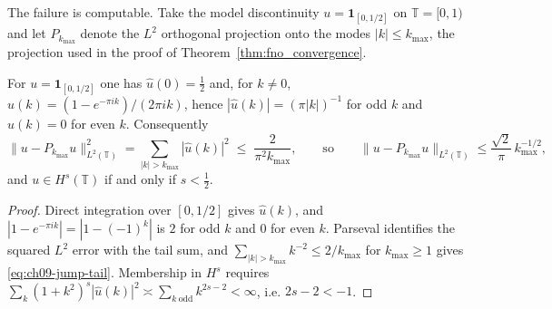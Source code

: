 The failure is computable. Take the model discontinuity
$u = \mathbf{1}_{[0,1/2]}$ on $\mathbb{T}=[0,1)$ and let $P_{k_{\max}}$ denote
the $L^2$ orthogonal projection onto the modes $|k|\le k_{\max}$, the projection
used in the proof of Theorem~\ref{thm:fno_convergence}.

\begin{proposition}
\label{prop:ch09-jump}
For $u=\mathbf{1}_{[0,1/2]}$ one has $\hat{u}(0)=\tfrac12$ and, for $k\ne 0$,
$\hat{u}(k) = (1-e^{-\pi i k})/(2\pi i k)$,
hence $|\hat{u}(k)| = (\pi|k|)^{-1}$ for odd $k$ and $\hat{u}(k)=0$ for even
$k$. Consequently
\begin{equation}
  \|u - P_{k_{\max}} u\|_{L^2(\mathbb{T})}^{2}
  = \sum_{|k|>k_{\max}}|\hat{u}(k)|^{2}
  \;\le\; \frac{2}{\pi^{2}k_{\max}},
  \qquad\text{so}\qquad
  \|u-P_{k_{\max}}u\|_{L^2(\mathbb{T})} \le \frac{\sqrt{2}}{\pi}\,k_{\max}^{-1/2},
  \label{eq:ch09-jump-tail}
\end{equation}
and $u\in H^s(\mathbb{T})$ if and only if $s<\tfrac12$.
\end{proposition}
\begin{proof}
Direct integration over $[0,1/2]$ gives $\hat{u}(k)$, and
$|1-e^{-\pi i k}| = |1-(-1)^k|$ is $2$ for odd $k$ and $0$ for even $k$. Parseval
identifies the squared $L^2$ error with the tail sum, and
$\sum_{|k|>k_{\max}}k^{-2}\le 2/k_{\max}$ for $k_{\max}\ge1$ gives
\eqref{eq:ch09-jump-tail}.
Membership in $H^s$ requires
$\sum_k (1+k^2)^s|\hat u(k)|^2 \asymp \sum_{k\ \mathrm{odd}} k^{2s-2}<\infty$,
i.e. $2s-2<-1$.
\end{proof}


